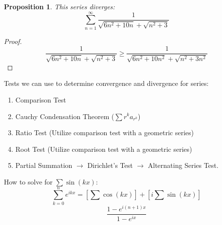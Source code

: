 \documentclass[12pt,reqno]{amsart}
\theoremstyle{plain}
\newtheorem*{proposition}{Proposition}
\begin{document}
    \begin{proposition}
        This series diverges:
        \[ \sum_{n=1}^\infty \frac 1 {\sqrt{6n^2 + 10n} + \sqrt{n^2 + 3}}\] 
    \end{proposition}

    \begin{proof}
        \[ \frac 1 {\sqrt{6n^2 + 10n} + \sqrt{n^2 + 3}} \ge \frac 1 {\sqrt{6n^2 + 10n^2} + \sqrt{n^2 + 3n^2}} \]

    \end{proof}

    Tests we can use to determine convergence and divergence for series:
    \begin{enumerate}
        \item Comparison Test
        \item Cauchy Condensation Theorem ($\sum r^k a_{r^k}$)
        \item Ratio Test (Utilize comparison test with a geometric series)
        \item Root Test (Utilize comparison test with a geometric series)
        \item Partial Summation $\to$ Dirichlet's Test $\to$ Alternating Series Test.
    \end{enumerate}

    How to solve for $\sum \sin(kx)$: \\
    \[ \sum_{k=0}^n e^{ikx} = \left[ \sum \cos(kx) \right] + \left[ i\sum \sin(kx) \right]\]
    \[ \frac {1 - e^{i(n+1)x}}{1-e^{ix}} \]
\end{document}
